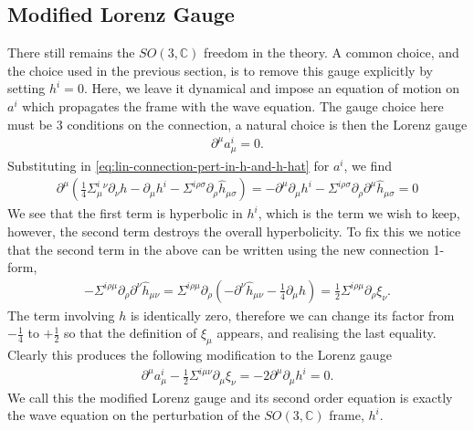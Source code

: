 \documentclass[10pt]{report}
\theoremstyle{definition}
\newcommand{\C}[0]{\mathbb{C}}
\begin{document}
        \subsection{Modified Lorenz Gauge}
        There still remains the $SO(3,\C)$ freedom in the theory. A common choice, and the choice used in the previous section, is to remove this gauge explicitly by setting $h^i = 0$. Here, we leave it dynamical and impose an equation of motion on $a^i$ which propagates the frame with the wave equation. The gauge choice here must be $3$ conditions on the connection, a natural choice is then the Lorenz gauge
        \begin{align}
            \partial^\mu a^i_\mu = 0.
        \end{align}
        Substituting in \cref{eq:lin-connection-pert-in-h-and-h-hat} for $a^i$, we find 
        \begin{align}
            \partial^\mu \left( \frac{1}{4} \Sigma^i_\mu{}^\nu \partial_\nu h - \partial_\mu h^i - \Sigma^{i\rho\sigma} \partial_\rho \hat{h}_{\mu\sigma} \right) = - \partial^\mu \partial_\mu h^i -\Sigma^{i\rho\sigma} \partial_\rho \partial^\mu \hat{h}_{\mu\sigma} = 0
        \end{align}
        We see that the first term is hyperbolic in $h^i$, which is the term we wish to keep, however, the second term destroys the overall hyperbolicity. To fix this we notice that the second term in the above can be written using the new connection 1-form,
        \begin{align}
            -\Sigma^{i\rho\mu} \partial_\rho \partial^\nu \hat{h}_{\mu\nu} = \Sigma^{i\rho\mu} \partial_\rho \left( -\partial^\nu \hat{h}_{\mu\nu} - \frac{1}{4} \partial_\mu h \right) = \frac{1}{2} \Sigma^{i\rho\mu} \partial_\rho \xi_\nu.
        \end{align}
        The term involving $h$ is identically zero, therefore we can change its factor from $-\frac{1}{4}$ to $+\frac{1}{2}$ so that the definition of $\xi_\mu$ appears, and realising the last equality. Clearly this produces the following modification to the Lorenz gauge
        \begin{align}
            \partial^\mu a^i_\mu - \frac{1}{2} \Sigma^{i\mu\nu} \partial_\mu \xi_\nu = -2 \partial^\mu \partial_\mu h^i = 0.
        \end{align} 
        We call this the modified Lorenz gauge and its second order equation is exactly the wave equation on the perturbation of the $SO(3,\C)$ frame, $h^i$.
\end{document}

